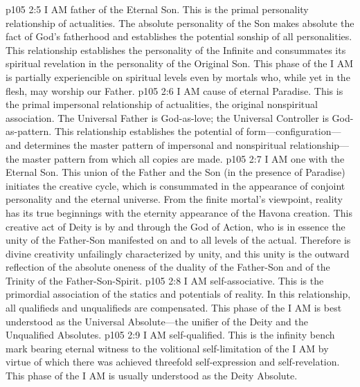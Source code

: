 \pc \vs p105 2:5 \bibnobreakspace {} I AM father of the Eternal Son. This is the primal personality relationship of actualities. The absolute personality of the Son makes absolute the fact of God’s fatherhood and establishes the potential sonship of all personalities. This relationship establishes the personality of the Infinite and consummates its spiritual revelation in the personality of the Original Son. This phase of the I AM is partially experiencible on spiritual levels even by mortals who, while yet in the flesh, may worship our Father.
\pc \vs p105 2:6 \bibnobreakspace {} I AM cause of eternal Paradise. This is the primal impersonal relationship of actualities, the original nonspiritual association. The Universal Father is God\hyp{}as\hyp{}love; the Universal Controller is God\hyp{}as\hyp{}pattern. This relationship establishes the potential of form---configuration---and determines the master pattern of impersonal and nonspiritual relationship---the master pattern from which all copies are made.
\pc \vs p105 2:7 \bibnobreakspace {} I AM one with the Eternal Son. This union of the Father and the Son (in the presence of Paradise) initiates the creative cycle, which is consummated in the appearance of conjoint personality and the eternal universe. From the finite mortal’s viewpoint, reality has its true beginnings with the eternity appearance of the Havona creation. This creative act of Deity is by and through the God of Action, who is in essence the unity of the Father\hyp{}Son manifested on and to all levels of the actual. Therefore is divine creativity unfailingly characterized by unity, and this unity is the outward reflection of the absolute oneness of the duality of the Father\hyp{}Son and of the Trinity of the Father\hyp{}Son\hyp{}Spirit.
\pc \vs p105 2:8 \bibnobreakspace {} I AM self\hyp{}associative. This is the primordial association of the statics and potentials of reality. In this relationship, all qualifieds and unqualifieds are compensated. This phase of the I AM is best understood as the Universal Absolute---the unifier of the Deity and the Unqualified Absolutes.
\pc \vs p105 2:9 \bibnobreakspace {} I AM self\hyp{}qualified. This is the infinity bench mark bearing eternal witness to the volitional self\hyp{}limitation of the I AM by virtue of which there was achieved threefold self\hyp{}expression and self\hyp{}revelation. This phase of the I AM is usually understood as the Deity Absolute.
